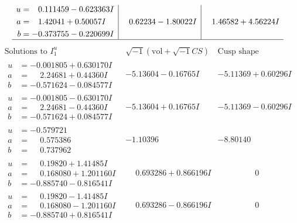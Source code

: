\documentclass[1p]{elsarticle_modified}
\theoremstyle{definition}
\newcommand{\I}{\sqrt{-1}}
\begin{document}
$$\begin{array}{c|c|c}
\begin{aligned}
u &= \phantom{-}0.111459 - 0.623363 I \\
a &= \phantom{-}1.42041 + 0.50057 I \\
b &= -0.373755 - 0.220699 I\end{aligned}
 & \phantom{-}0.62234 - 1.80022 I & \phantom{-}1.46582 + 4.56224 I\\
 \hline 
 \end{array}$$\newpage$$\begin{array}{c|c|c}  
\text{Solutions to }I^u_{1}& \I (\text{vol} + \sqrt{-1}CS) & \text{Cusp shape}\\
 \hline 
\begin{aligned}
u &= -0.001805 + 0.630170 I \\
a &= \phantom{-}2.24681 + 0.44360 I \\
b &= -0.571624 - 0.084577 I\end{aligned}
 & -5.13604 - 0.16765 I & -5.11369 + 0.60296 I \\ \hline\begin{aligned}
u &= -0.001805 - 0.630170 I \\
a &= \phantom{-}2.24681 - 0.44360 I \\
b &= -0.571624 + 0.084577 I\end{aligned}
 & -5.13604 + 0.16765 I & -5.11369 - 0.60296 I \\ \hline\begin{aligned}
u &= -0.579721\phantom{ +0.000000I} \\
a &= \phantom{-}0.575386\phantom{ +0.000000I} \\
b &= \phantom{-}0.737962\phantom{ +0.000000I}\end{aligned}
 & -1.10396\phantom{ +0.000000I} & -8.80140\phantom{ +0.000000I} \\ \hline\begin{aligned}
u &= \phantom{-}0.19820 + 1.41485 I \\
a &= \phantom{-}0.168080 + 1.201160 I \\
b &= -0.885740 - 0.816541 I\end{aligned}
 & \phantom{-}0.693286 + 0.866196 I & \phantom{-0.000000 } 0 \\ \hline\begin{aligned}
u &= \phantom{-}0.19820 - 1.41485 I \\
a &= \phantom{-}0.168080 - 1.201160 I \\
b &= -0.885740 + 0.816541 I\end{aligned}
 & \phantom{-}0.693286 - 0.866196 I & \phantom{-0.000000 } 0 \\ \hline\begin{aligned}

\end{aligned}
\end{array}$$
\end{document}
